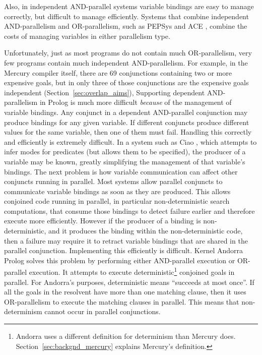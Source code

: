 Also,
in independent AND-parallel systems
variable bindings are easy to manage correctly,
but difficult to manage efficiently.
Systems that combine independent AND-parallelism and OR-parallelism,
such as 
PEPSys \citep*{baron:1988:pepsys}
and
ACE \citep*{gupta:1991:ace},
combine the costs of managing variables in either parallelism type.

Unfortunately,
just as most programs do not contain much OR-parallelism,
very few programs contain much independent AND-parallelism.
For example, in the Mercury compiler itself,
there are 69 conjunctions containing two or more expensive goals,
but in only three of those conjunctions are the expensive goals independent
(Section~\ref{sec:overlap_aims}),
Supporting dependent AND-parallelism in Prolog
is much more difficult \emph{because} of the management of variable
bindings.
Any conjunct in a dependent AND-parallel conjunction may produce bindings
for any given variable.
If different conjuncts produce different values for the same variable,
then one of them must fail.
Handling this correctly and efficiently is extremely difficult.
In a system such as Ciao \citep{hermenegildo_ciao},
which attempts to infer modes for predicates (but allows them to be
specified),
the producer of a variable may be known,
greatly simplifying the management of that variable's bindings.
The next problem is how variable communication can affect other conjuncts
running in parallel.
Most systems allow parallel conjuncts to communicate variable bindings as
soon as they are produced.
This allows conjoined code running in parallel,
in particular non-deterministic search computations,
that consume those bindings to detect failure earlier and therefore execute
more efficiently.
However if the producer of a binding is non-deterministic,
and it produces the binding within the non-deterministic code,
then a failure may require it to retract variable bindings that are shared
in the parallel conjunction.
Implementing this efficiently is difficult.
Kernel Andorra Prolog \citep*{haridi:1990:andorra}
solves this problem by performing either AND-parallel execution or
OR-parallel execution.
It attempts to execute deterministic\footnote{
    Andorra uses a different definition for determinism than Mercury does.
    Section~\ref{sec:backgnd_mercury} explains Mercury's definition.}
conjoined goals in parallel.
For Andorra's purposes, deterministic means ``succeeds at most once''.
If all the goals in the resolvent have more than one matching clause,
then it uses OR-parallelism to execute the matching clauses in parallel.
This means that non-determinism cannot occur in parallel conjunctions.


